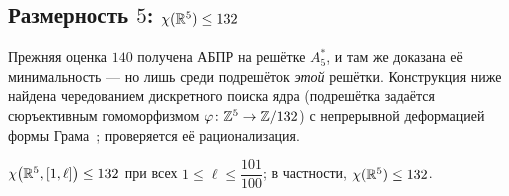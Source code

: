\subsection{Размерность $5$: $\chi(\mathbb{R}^5)\le132$}\label{ssec:dim5}

Прежняя оценка $140$ получена АБПР на решётке $A_5^*$, и там же доказана её
минимальность --- но лишь среди подрешёток \emph{этой} решётки. Конструкция
ниже найдена чередованием дискретного поиска ядра (подрешётка задаётся
сюръективным гомоморфизмом $\varphi\colon\mathbb{Z}^5\to\mathbb{Z}/132$) с непрерывной
деформацией формы Грама~\cite{Repo}; проверяется её
рационализация.

\begin{keybox}
\begin{theorem}\label{thm:r5}
$\chi\bigl(\mathbb{R}^5,[1,\ell]\bigr)\le132$ при всех $1\le\ell\le\dfrac{101}{100}$;
в частности, $\chi(\mathbb{R}^5)\le132$.
\end{theorem}
\end{keybox}

